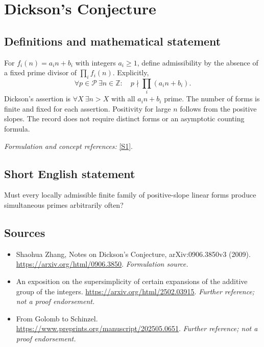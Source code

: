 \documentclass[11pt]{article}
\begin{document}
\section*{\texorpdfstring{Dickson's Conjecture}{Dickson's Conjecture}}\label{1293}
\subsection{Definitions and mathematical statement}
For $f_i(n)=a_in+b_i$ with integers $a_i\ge1$, define admissibility by the absence of a fixed prime divisor of $\prod_i f_i(n)$. Explicitly,
\[
 \forall p\in\mathcal P\ \exists n\in{\mathbb{Z}}:\quad p\nmid\prod_i(a_in+b_i).
\]
Dickson's assertion is $\forall X\ \exists n>X$ with all $a_in+b_i$ prime. The number of forms is finite and fixed for each assertion. Positivity for large $n$ follows from the positive slopes. The record does not require distinct forms or an asymptotic counting formula.
\par\smallskip\textit{Formulation and concept references:} \href{https://arxiv.org/html/0906.3850}{[S1]}.

\subsection{Short English statement}
Must every locally admissible finite family of positive-slope linear forms produce simultaneous primes arbitrarily often?
\subsection{Sources}
\begin{itemize}
\item[S1]Shaohua Zhang, Notes on Dickson's Conjecture, arXiv:0906.3850v3 (2009).
\url{https://arxiv.org/html/0906.3850}.
\textit{Formulation source.}
\item[S2]An exposition on the supersimplicity of certain expansions of the additive group of the integers.
\url{https://arxiv.org/html/2502.03915}.
\textit{Further reference; not a proof endorsement.}
\item[S3]From Golomb to Schinzel.
\url{https://www.preprints.org/manuscript/202505.0651}.
\textit{Further reference; not a proof endorsement.}
\end{itemize}
\end{document}
